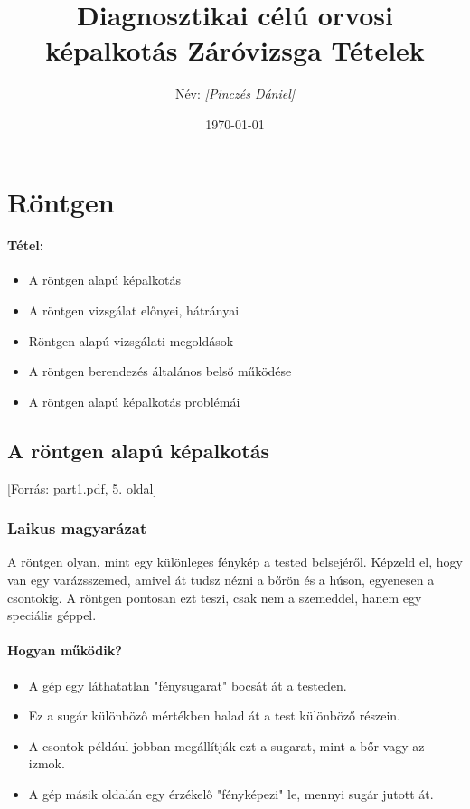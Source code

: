 \documentclass[a4paper,12pt]{article}
\title{\textbf{Diagnosztikai célú orvosi képalkotás Záróvizsga Tételek}}
\author{Név: \textit{[Pinczés Dániel]}}
\date{\today}
\begin{document}
    \maketitle
    \thispagestyle{empty}
    \newpage

    \tableofcontents
    \newpage
    
    
\section{Röntgen}

\paragraph{Tétel:}
\begin{itemize}
\item A röntgen alapú képalkotás
\item A röntgen vizsgálat előnyei, hátrányai
\item Röntgen alapú vizsgálati megoldások
\item  A röntgen berendezés általános belső működése
\item A röntgen alapú képalkotás problémái
\end{itemize}

\subsection{A röntgen alapú képalkotás} [Forrás: part1.pdf, 5. oldal]

\subsubsection{Laikus magyarázat}

A röntgen olyan, mint egy különleges fénykép a tested belsejéről. Képzeld el, hogy van egy varázsszemed, amivel át tudsz nézni a bőrön és a húson, egyenesen a csontokig. A röntgen pontosan ezt teszi, csak nem a szemeddel, hanem egy speciális géppel.

\paragraph{Hogyan működik?} \begin{itemize} \item A gép egy láthatatlan "fénysugarat" bocsát át a testeden. \item Ez a sugár különböző mértékben halad át a test különböző részein. \item A csontok például jobban megállítják ezt a sugarat, mint a bőr vagy az izmok. \item A gép másik oldalán egy érzékelő "fényképezi" le, mennyi sugár jutott át. \end{itemize}
\end{document}
